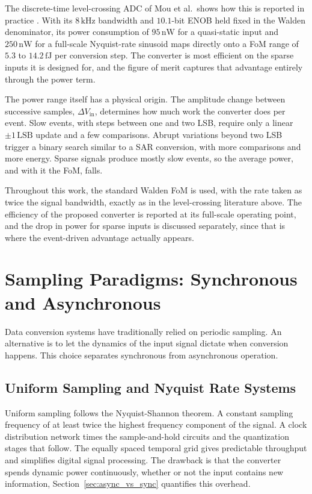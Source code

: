 The discrete-time level-crossing ADC of Mou et al.\ shows how this is reported in practice \cite{mou2026}. With its $8\,\mathrm{kHz}$ bandwidth and $10.1$-bit ENOB held fixed in the Walden denominator, its power consumption of $95\,\mathrm{nW}$ for a quasi-static input and $250\,\mathrm{nW}$ for a full-scale Nyquist-rate sinusoid maps directly onto a FoM range of $5.3$ to $14.2\,\mathrm{fJ}$ per conversion step. The converter is most efficient on the sparse inputs it is designed for, and the figure of merit captures that advantage entirely through the power term.

The power range itself has a physical origin. The amplitude change between successive samples, $\Delta V_{\mathrm{in}}$, determines how much work the converter does per event. Slow events, with steps between one and two LSB, require only a linear $\pm1\,\mathrm{LSB}$ update and a few comparisons. Abrupt variations beyond two LSB trigger a binary search similar to a SAR conversion, with more comparisons and more energy. Sparse signals produce mostly slow events, so the average power, and with it the FoM, falls.

Throughout this work, the standard Walden FoM is used, with the rate taken as twice the signal bandwidth, exactly as in the level-crossing literature above. The efficiency of the proposed converter is reported at its full-scale operating point, and the drop in power for sparse inputs is discussed separately, since that is where the event-driven advantage actually appears.



\section{Sampling Paradigms: Synchronous and Asynchronous}
Data conversion systems have traditionally relied on periodic sampling. An alternative is to let the dynamics of the input signal dictate when conversion happens. This choice separates synchronous from asynchronous operation.

\subsection{Uniform Sampling and Nyquist Rate Systems}
Uniform sampling follows the Nyquist-Shannon theorem. A constant sampling frequency of at least twice the highest frequency component of the signal. A clock distribution network times the sample-and-hold circuits and the quantization stages that follow. The equally spaced temporal grid gives predictable throughput and simplifies digital signal processing. The drawback is that the converter spends dynamic power continuously, whether or not the input contains new information, Section~\ref{sec:async_vs_sync} quantifies this overhead.


